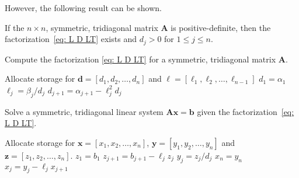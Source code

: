 However, the following result can be shown.

\begin{theorem}
If the $n\times n$, symmetric, tridiagonal matrix $\boldsymbol{A}$ is 
positive-definite, then the factorization~\eqref{eq: L D LT} exists and $d_j>0$ 
for $1\le j\le n$.
\end{theorem}

\begin{algorithm}
\caption{Compute the factorization \eqref{eq: L D LT} for a symmetric, 
tridiagonal matrix $\boldsymbol{A}$.}
\label{alg: LDLT}
\begin{algorithmic}
\Statex
{}
\State Allocate storage for $\boldsymbol{d}=[d_1,d_2,\ldots, d_n]$ and
$\boldsymbol{\ell}=[\ell_1,\ell_2,\ldots,\ell_{n-1}]$
\State $d_1=\alpha_1$
\State $\ell_j=\beta_j/d_j$
\State $d_{j+1}=\alpha_{j+1}-\ell_j^2d_j$
\EndFor
\State{}
\EndFunction
\end{algorithmic}
\end{algorithm}

\begin{algorithm}
\caption{Solve a symmetric, tridiagonal linear system 
$\boldsymbol{A}\boldsymbol{x}=\boldsymbol{b}$ given the 
factorization~\eqref{eq: L D LT}.}
\label{alg: solve symmetric tridiagonal}
\begin{algorithmic}
\Statex
{}
\State Allocate storage for $\boldsymbol{x}=[x_1,x_2,\ldots,x_n]$,
$\boldsymbol{y}=[y_1,y_2,\ldots,y_n]$ and $\boldsymbol{z}=[z_1,z_2,\ldots,z_n]$.
\State $z_1=b_1$
\State $z_{j+1}=b_{j+1}-\ell_jz_j$
\EndFor
{}
\State $y_j=z_j/d_j$
\EndFor
\State $x_n=y_n$
\State $x_j=y_j-\ell_jx_{j+1}$
\EndFor
\State{}
\EndFunction
\end{algorithmic}
\end{algorithm}

